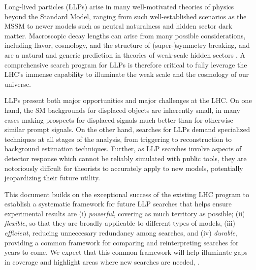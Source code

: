 


Long-lived particles (LLPs) arise in many well-motivated theories of physics beyond the Standard Model, ranging from such well-established scenarios as the MSSM to newer models such as neutral naturalness and hidden sector dark matter.  Macroscopic decay lengths can arise from many possible considerations, including flavor, cosmology, and the structure of (super-)symmetry breaking, and are a natural and generic prediction in theories of weak-scale hidden sectors .  A comprehensive search program for LLPs is therefore critical to fully leverage the LHC's immense capability to illuminate the weak scale and the cosmology of our universe. 

LLPs present both major opportunities and major challenges at the LHC.  On one hand, the SM backgrounds for displaced objects are inherently small, in many cases making prospects for displaced signals much better than for otherwise similar prompt signals.  On the other hand, searches for LLPs demand specialized techniques at all stages of the analysis, from triggering to reconstruction to background estimation techniques.  Further, as LLP searches involve aspects of detector response which cannot be reliably simulated with public tools, they are notoriously diffcult for theorists to accurately apply to new models, potentially jeopardizing their future utility.  

This document builds on the exceptional success of the existing LHC program to establish a systematic framework for future LLP searches that helps ensure experimental results are (i) {\em powerful}, covering as much territory as possible; (ii) {\em flexible}, so that they are broadly applicable to different types of models, (iii) {\em efficient}, reducing unneccesary redundancy among searches, and (iv) {\em durable}, providing a common framework for comparing and reinterpreting searches for years to come.
We expect that this common framework will help illuminate gaps in coverage and highlight areas where new searches are needed, .





